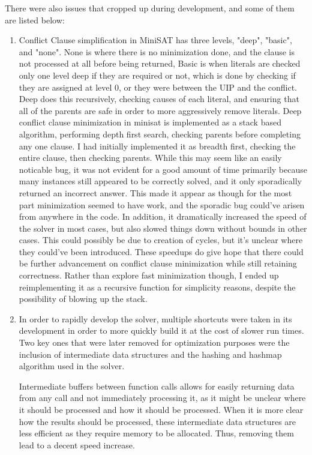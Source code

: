 \documentclass[11pt]{extarticle}
\begin{document}
There were also issues that cropped up during development, and some of them are listed below:
\begin{enumerate}
\item
Conflict Clause simplification in MiniSAT has three levels, "deep", "basic", and "none". None is
where there is no minimization done, and the clause is not processed at all before being
returned, Basic is when literals are checked only one level deep if they are required or not,
which is done by checking if they are assigned at level 0, or they were between the UIP and the
conflict. Deep does this recursively, checking causes of each literal, and ensuring that all of
the parents are safe in order to more aggressively remove literals. Deep conflict clause
minimization in minisat is implemented as a stack based algorithm, performing depth first
search, checking parents before completing any one clause. I had initially implemented it as
breadth first, checking the entire clause, then checking parents. While this may seem like an
easily noticable bug, it was not evident for a good amount of time primarily because many
instances still appeared to be correctly solved, and it only sporadically returned an incorrect
answer. This made it appear as though for the most part minimization seemed to have work, and
the sporadic bug could've arisen from anywhere in the code. In addition, it dramatically
increased the speed of the solver in most cases, but also slowed things down without bounds in
other cases. This could possibly be due to creation of cycles, but it's unclear where they
could've been introduced. These speedups do give hope that there could be further advancement on
conflict clause minimization while still retaining correctness. Rather than explore fast
minimization though, I ended up reimplementing it as a recursive function for simplicity
reasons, despite the possibility of blowing up the stack.
\item
In order to rapidly develop the solver, multiple shortcuts were taken in its development in
order to more quickly build it at the cost of slower run times. Two key ones that were later
removed for optimization purposes were the inclusion of intermediate data structures and the
hashing and hashmap algorithm used in the solver.

Intermediate buffers between function calls allows for
easily returning data from any call and not immediately processing it, as it might be unclear
where it should be processed and how it should be processed. When it is more clear how the
results should be processed, these intermediate data structures are less efficient as they
require memory to be allocated. Thus, removing them lead to a decent speed increase.


\end{enumerate}
\end{document}
